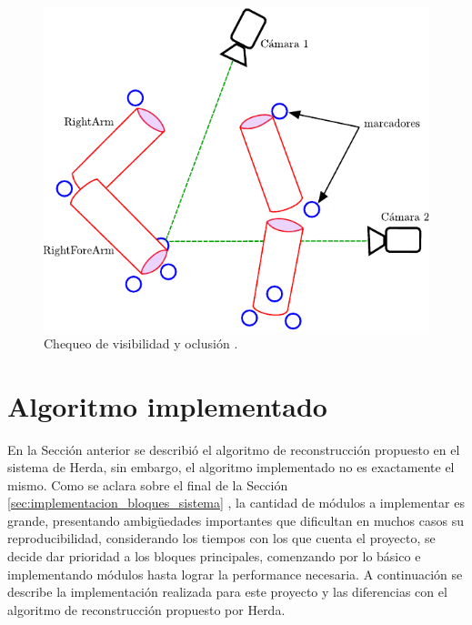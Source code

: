 \begin{figure}[ht!]
 \begin{center}
 \includegraphics[scale=0.8]{img/Reconstruccion/oclusion_herda}
 \end{center}
 \caption{Chequeo de visibilidad y oclusión \cite{herda}.}
 \label{fig:oclusion_herda}
 \end{figure}


\section{Algoritmo implementado}

En la Sección anterior se describió el algoritmo de reconstrucción propuesto en el sistema de Herda, sin embargo, el algoritmo implementado no es exactamente el mismo. Como se aclara sobre el final de la Sección \ref{sec:implementacion_bloques_sistema} , la cantidad de módulos a implementar es grande, presentando ambigüedades importantes que dificultan en muchos casos su reproducibilidad, considerando los tiempos con los que cuenta el proyecto, se decide dar prioridad a los bloques principales, comenzando por lo básico e implementando módulos hasta lograr la performance necesaria. A continuación se describe la implementación realizada para este proyecto y las diferencias con el algoritmo de reconstrucción propuesto por Herda.\\


